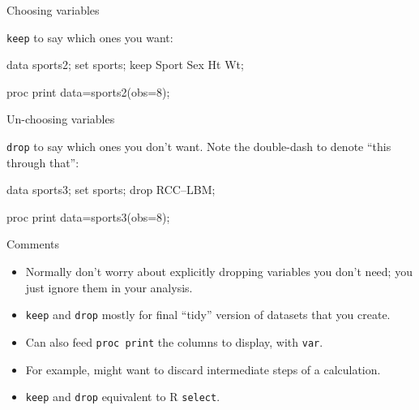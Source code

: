 \documentclass[unknownkeysallowed]{beamer}\usepackage[]{graphicx}\usepackage[]{color}
\begin{document}
\begin{frame}[fragile]{Choosing variables}
  
  \texttt{keep} to say which ones you want:

  \begin{Datastep}
data sports2;
  set sports;
  keep Sport Sex Ht Wt;
  \end{Datastep}
  
  \begin{Sascode}[store=tb]
proc print data=sports2(obs=8);
  \end{Sascode}
  
  
\end{frame}


\begin{frame}[fragile]{Un-choosing variables}
  
  \texttt{drop} to say which ones you don't want. Note the double-dash
  to denote ``this through that'':

  \begin{Datastep}
data sports3;
  set sports;
  drop RCC--LBM;
  \end{Datastep}
  
  \begin{Sascode}[store=tc]
    proc print data=sports3(obs=8);
  \end{Sascode}


\end{frame}

\begin{frame}[fragile]{Comments}
  
  \begin{itemize}
  \item Normally don't worry about explicitly dropping variables you
    don't need; you just ignore them in your analysis.
  \item \texttt{keep} and \texttt{drop} mostly for final ``tidy'' version of
    datasets that you create.
  \item Can also feed \texttt{proc print} the columns to display, with
    \texttt{var}. 
  \item For example, might want to discard intermediate steps of a
    calculation. 
  \item \texttt{keep} and \texttt{drop} equivalent to R
    \texttt{select}.
  \end{itemize}
  
\end{frame}
\end{document}
